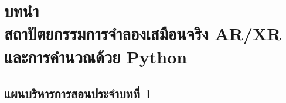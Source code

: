 \chapter[บทนำ: สถาปัตยกรรมเสมือนจริงและการคำนวณด้วย Python]{บทนำ\\สถาปัตยกรรมการจำลองเสมือนจริง AR/XR\\และการคำนวณด้วย Python}
\label{chap:introduction}


\section*{แผนบริหารการสอนประจำบทที่ 1}

